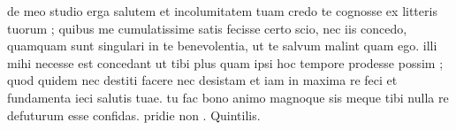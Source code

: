 


 de meo studio erga salutem et incolumitatem tuam credo te cognosse ex litteris tuorum ; quibus me cumulatissime satis fecisse certo scio, nec iis concedo, quamquam sunt singulari in te benevolentia, ut te salvum malint quam ego. illi mihi necesse est concedant ut tibi plus quam ipsi hoc tempore prodesse possim ; quod quidem nec destiti facere nec desistam et iam in maxima re feci et fundamenta ieci salutis tuae. tu fac bono animo magnoque sis meque tibi nulla re defuturum esse confidas. pridie non . Quintilis.
